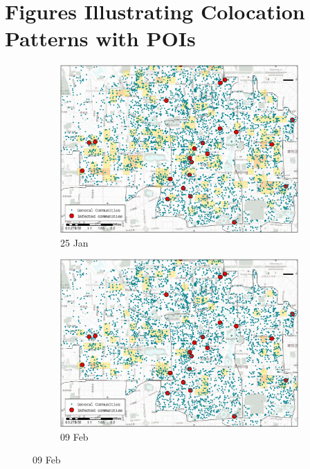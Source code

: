 \documentclass[preprints,ijgi,submit,moreauthors]{Definitions/mdpi}
\begin{document}
\newpage
{} %
\appendix
\section{Figures Illustrating Colocation Patterns with POIs}


\begin{figure}[ht]
    \centering
    \begin{subfigure}{.334\textwidth}
        \includegraphics[width=\textwidth]{Figures/Relation_with_POIs/POI_resD2020_01_25.eps}
        \caption{25 Jan}
    \end{subfigure}
    \begin{subfigure}{.334\textwidth}
        \includegraphics[width=\textwidth]{Figures/Relation_with_POIs/POI_resD2020_02_09.eps}
        \caption{09 Feb}
    \end{subfigure}


\end{figure}
\end{document}
